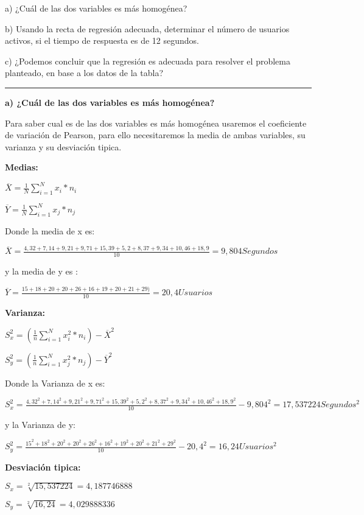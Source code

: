 \documentclass{article}
\begin{document}
a) ¿Cu\'al de las dos variables es m\'as homog\'enea?

b) Usando la recta de regresi\'on adecuada, determinar el n\'umero de usuarios activos, si el tiempo de respuesta es de 12 segundos.

c) ¿Podemos concluir que la regresi\'on es adecuada para resolver el problema planteado, en base a los datos de la tabla? 

\rule{119mm}{0.2mm}

\textbf{a) ¿Cu\'al de las dos variables es m\'as homog\'enea?}

Para saber cual es de las dos variables es m\'as homog\'enea usaremos el coeficiente de variaci\'on de Pearson, para ello necesitaremos la media de ambas variables, su varianza y su desviaci\'on tipica.

\textbf{Medias:}

\(\overline{X} = \frac{1}{N} \displaystyle\sum_{i=1}^{N} x_{i} * n_{i} \)          
    
\(\overline{Y} = \frac{1}{N} \displaystyle\sum_{i=1}^{N} x_{j} * n_{j} \)

Donde la media de x es: 

\(\overline{X} = \frac{4,32 + 7,14 + 9,21 + 9,71 + 15,39 + 5,2 + 8,37 + 9,34 + 10,46 + 18,9}{10} = 9,804 Segundos \)

y la media de y es :

\(\overline{Y} = \frac{15 + 18 + 20 + 20 + 26 + 16 + 19 + 20 + 21 + 29)}{10} = 20,4 Usuarios \)

\textbf{Varianza:}

\(S_{x}^2 = (\frac{1}{n} \displaystyle\sum_{i=1}^{N} x_{i}^2 * n_{i}) - \overline{X}^2\)

\(S_{y}^2 = (\frac{1}{n} \displaystyle\sum_{i=1}^{N} x_{j}^2 * n_{j}) - \overline{Y}^2\)

Donde la Varianza de x es:

\(S_{x}^2 = \frac{4,32^{2}  + 7,14^{2} + 9,21^{2} + 9,71^{2}  + 15,39^{2} + 5,2^{2} + 8,37^{2} + 9,34^{2} + 10,46^{2} + 18,9^{2}}{10} - 9,804^{2} = 17,537224 Segundos^{2}\)

y la Varianza de y:

\(S_{y}^2 = \frac{15^{2} + 18^{2} + 20^{2} + 20^{2} + 26^{2} + 16^{2} + 19^{2} + 20^{2} + 21^{2} + 29^{2}}{10} - 20,4^{2} = 16,24 Usuarios^{2}\)

\textbf{Desviaci\'on tipica:}

\(S_{x} = \sqrt[2]{15,537224} = 4,187746888\)

\(S_{y} = \sqrt[2]{16,24} = 4,029888336\)
\end{document}
